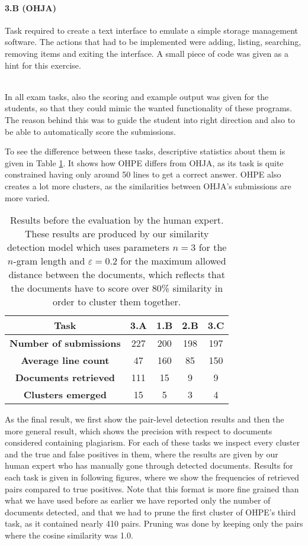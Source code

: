 \paragraph{3.B (OHJA)} Task required to create a text interface to emulate a simple storage management software. The actions that had to be implemented were adding, listing, searching, removing items and exiting the interface. A small piece of code was given as a hint for this exercise.

\mbox{}\\
\noindent
In all exam tasks, also the scoring and example output was given for the students, so that they could mimic the wanted functionality of these programs. The reason behind this was to guide the student into right direction and also to be able to automatically score the submissions.

To see the difference between these tasks, descriptive statistics about them is given in Table \ref{tbl-plagdet-desc-stat}. It shows how OHPE differs from OHJA, as its task is quite constrained having only around 50 lines to get a correct answer. OHPE also creates a lot more clusters, as the similarities between OHJA's submissions are more varied.


\begin{table}[ht]
\centering
\caption{Results before the evaluation by the human expert. These results are produced by our similarity detection model which uses parameters $n=3$ for the $n$-gram length and $\varepsilon=0.2$ for the maximum allowed distance between the documents, which reflects that the documents have to score over 80\% similarity in order to cluster them together.}
\begin{tabular}{|c||c|c|c|c|}
\hline
\bf Task                & 3.A & 1.B & 2.B & 3.C  \\ \hline
\bf Number of submissions & 227 & 200 & 198 & 197 \\ \hline
\bf Average line count         & 47   & 160    & 85   & 150     \\ \hline
\bf Documents retrieved & 111 & 15 & 9 & 9 \\ \hline
\bf Clusters emerged & 15 & 5 & 3 & 4 \\ \hline
\end{tabular}
\label{tbl-plagdet-desc-stat}
\end{table}

\noindent
As the final result, we first show the pair-level detection results and then the more general result, which shows the precision with respect to documents considered containing plagiarism. For each of these tasks we inspect every cluster and the true and false positives in them, where the results are given by our human expert who has manually gone through detected documents. Results for each task is given in following figures, where we show the frequencies of retrieved pairs compared to true positives. Note that this format is more fine grained than what we have used before as earlier we have reported only the number of documents detected, and that we had to prune the first cluster of OHPE's third task, as it contained nearly 410 pairs. Pruning was done by keeping only the pairs where the cosine similarity was 1.0.

